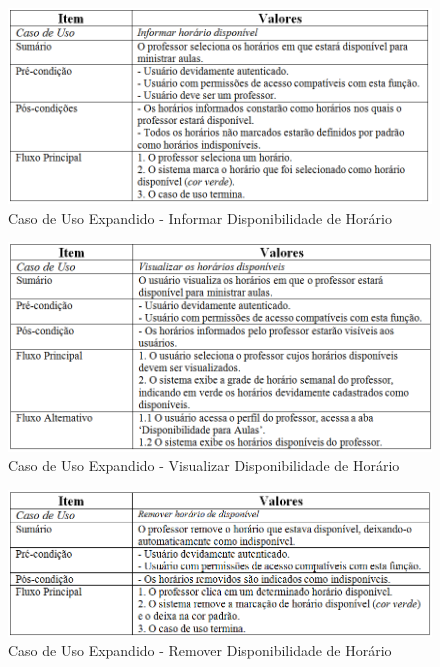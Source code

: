 \documentclass{abnt}
\begin{document}
		
		\begin{figure}[h]
					\begin{center}
						 \includegraphics[width=450px]{casoUsoInformarHorarioDisponivelAula}
						 \caption{Caso de Uso Expandido - Informar Disponibilidade de Horário}
					\end{center}
		\end{figure}
		
		\begin{figure}[h]
							\begin{center}
								 \includegraphics[width=450px]{casoUsoVisualizarHorarioDisponivelAula}
								 \caption{Caso de Uso Expandido - Visualizar Disponibilidade de Horário}
							\end{center}
				\end{figure}
				
		\begin{figure}[h]
									\begin{center}
										 \includegraphics[width=450px]{casoUsoRemoverHorarioDisponivelAula}
									 \caption{Caso de Uso Expandido - Remover Disponibilidade de Horário}
								\end{center}
					\end{figure}
		
\end{document}
